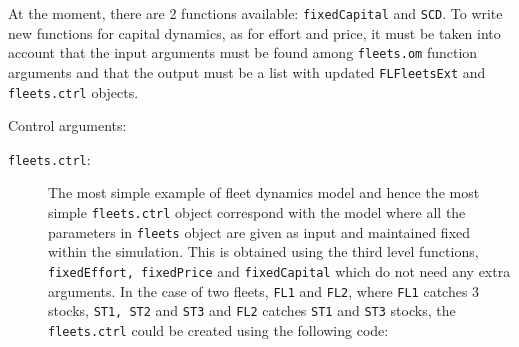 \begin{description}
	At the moment, there are 2 functions available: \texttt{fixedCapital} and \texttt{SCD}.
	To write new functions for capital dynamics, as for effort and price, it must be taken into account 
	that the input arguments must be found among \texttt{fleets.om} function arguments and that the 
	output must be a list with updated \texttt{FLFleetsExt} and \texttt{fleets.ctrl} objects.				
\end{description}


\noindent Control arguments:
\begin{description}
  \item[\texttt{fleets.ctrl}:] The most simple example of fleet dynamics model and hence 
  	the most simple \texttt{fleets.ctrl} object correspond with the model where all the parameters 
		in \texttt{fleets} object are given as input and maintained fixed
		 within the simulation. This is obtained using the third level functions, \texttt{fixedEffort, fixedPrice} and
		 \texttt{fixedCapital} which do not need any extra arguments. In the case of two fleets,
		 \texttt{FL1} and \texttt{FL2}, where \texttt{FL1} catches 3 stocks, \texttt{ST1, ST2} and \texttt{ST3} and \texttt{FL2}
		 catches  \texttt{ST1} and \texttt{ST3} stocks, the \texttt{fleets.ctrl} could be created using the following code:
     
  \begin{Schunk}
\end{Schunk}
\end{description}
